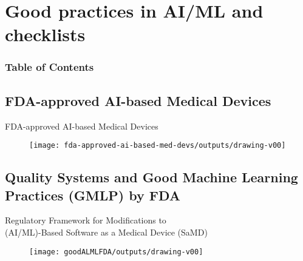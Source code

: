 \section{Good practices in AI/ML and checklists}
\begin{frame}
  \frametitle{Table of Contents}
  \tableofcontents[currentsection]
\end{frame}


\subsection{FDA-approved AI-based Medical Devices}

{
\begin{frame}{
FDA-approved AI-based Medical Devices
}{
}
      \begin{figure}
        \centering
        \texttt{[image: fda-approved-ai-based-med-devs/outputs/drawing-v00]}
      \end{figure}
\end{frame}
}







\subsection{Quality Systems and Good Machine Learning Practices (GMLP) by FDA}
{
\begin{frame}{
Regulatory Framework for Modifications to \\
(AI/ML)-Based Software as a Medical Device (SaMD)
}{
}
      \begin{figure}
        \centering
        \texttt{[image: goodALMLFDA/outputs/drawing-v00]}
      \end{figure}
\end{frame}
}

